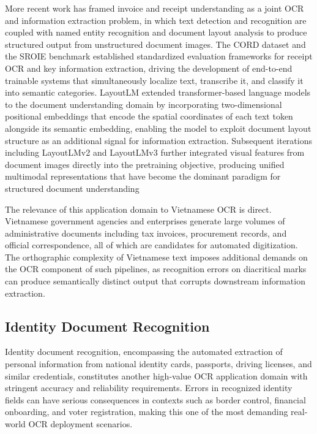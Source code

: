 More recent work has framed invoice and receipt understanding as a joint OCR and information extraction problem, in which text detection and recognition are coupled with named entity recognition and document layout analysis to produce structured output from unstructured document images. The CORD dataset \cite{Park2019} and the SROIE benchmark \cite{Huang2019} established standardized evaluation frameworks for receipt OCR and key information extraction, driving the development of end-to-end trainable systems that simultaneously localize text, transcribe it, and classify it into semantic categories. LayoutLM \cite{Xu2020} extended transformer-based language models to the document understanding domain by incorporating two-dimensional positional embeddings that encode the spatial coordinates of each text token alongside its semantic embedding, enabling the model to exploit document layout structure as an additional signal for information extraction. Subsequent iterations including LayoutLMv2 \cite{Xu2022} and LayoutLMv3 \cite{Huang2022} further integrated visual features from document images directly into the pretraining objective, producing unified multimodal representations that have become the dominant paradigm for structured document understanding

The relevance of this application domain to Vietnamese OCR is direct. Vietnamese government agencies and enterprises generate large volumes of administrative documents including tax invoices, procurement records, and official correspondence, all of which are candidates for automated digitization. The orthographic complexity of Vietnamese text imposes additional demands on the OCR component of such pipelines, as recognition errors on diacritical marks can produce semantically distinct output that corrupts downstream information extraction.

\subsection{Identity Document Recognition}
Identity document recognition, encompassing the automated extraction of personal information from national identity cards, passports, driving licenses, and similar credentials, constitutes another high-value OCR application domain with stringent accuracy and reliability requirements. Errors in recognized identity fields can have serious consequences in contexts such as border control, financial onboarding, and voter registration, making this one of the most demanding real-world OCR deployment scenarios.

